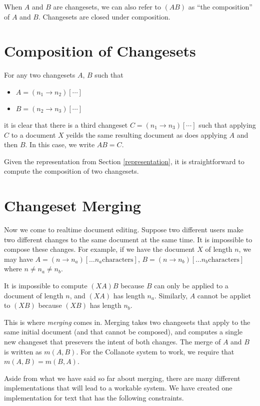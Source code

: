 \documentclass{article}
\begin{document}
When $A$ and $B$ are changesets, we can also refer to $(AB)$ as ``the composition'' of $A$ and $B$.  Changesets are closed under composition.

\section{Composition of Changesets}

For any two changesets $A$, $B$ such that

\begin{itemize}
\item[] $A=(n_1\rightarrow n_2)[\cdots]$
\item[] $B=(n_2\rightarrow n_3)[\cdots]$
\end{itemize}
it is clear that there is a third changeset $C=(n_1\rightarrow n_3)[\cdots]$ such that applying $C$ to a document $X$ yeilds the same resulting document as does applying $A$ and then $B$.  In this case, we write $AB=C$.

Given the representation from Section \ref{representation}, it is straightforward to compute the composition of two changesets.

\section{Changeset Merging}

Now we come to realtime document editing.  Suppose two different users make two different changes to the same document at the same time.  It is impossible to compose these changes.    For example, if we have the document $X$ of length $n$, we may have $A=(n\rightarrow n_a)[\ldots n_a \mathrm{characters}]$,  $B=(n\rightarrow n_b)[\ldots n_b \mathrm{characters}]$ where $n\neq n_a\neq n_b$.

It is impossible to compute $(XA)B$ because $B$ can only be applied to a document of length $n$, and $(XA)$ has length $n_a$.  Similarly, $A$ cannot be appliet to $(XB)$ because $(XB)$ has length $n_b$.

This is where \emph{merging} comes in.  Merging takes two changesets that apply to the same initial document (and that cannot be composed), and computes a single new changeset that presevers the intent of both changes.  The merge of $A$ and $B$ is written as $m(A,B)$.  For the Collanote system to work, we require that $m(A,B)=m(B,A)$.

Aside from what we have said so far about merging, there are many different implementations that will lead to a workable system.  We have created one implementation for text that has the following constraints.
\end{document}
